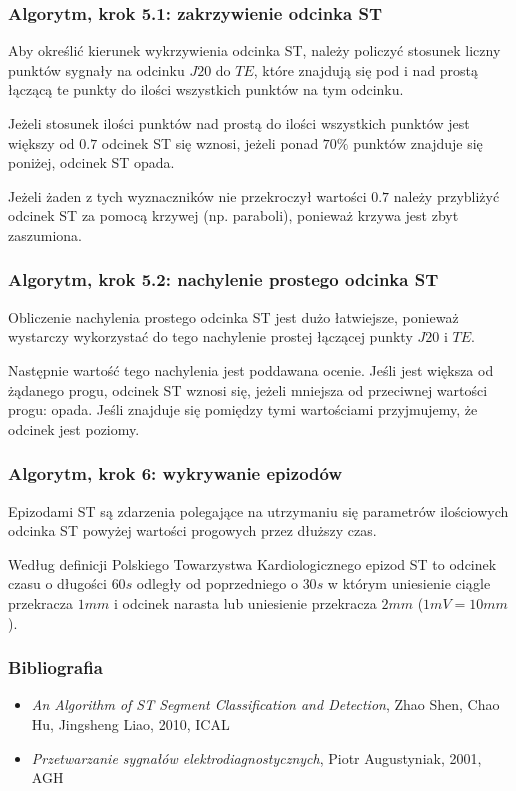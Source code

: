 \documentclass{beamer}
\begin{document}
\begin{frame}
  \frametitle{Algorytm, krok 5.1: zakrzywienie odcinka ST}

  Aby określić kierunek wykrzywienia odcinka ST, należy policzyć stosunek
  liczny punktów sygnały na odcinku $J20$ do $TE$, które znajdują się pod i nad
  prostą łączącą te punkty do ilości wszystkich punktów na tym odcinku.

  Jeżeli stosunek ilości punktów nad prostą do ilości wszystkich punktów jest
  większy od $0.7$ odcinek ST się wznosi, jeżeli ponad $70\%$ punktów znajduje
  się poniżej, odcinek ST opada. 
  
  Jeżeli żaden z tych wyznaczników nie przekroczył wartości $0.7$ należy
  przybliżyć odcinek ST za pomocą krzywej (np. paraboli), ponieważ krzywa jest
  zbyt zaszumiona.

\end{frame}


\begin{frame}
  \frametitle{Algorytm, krok 5.2: nachylenie prostego odcinka ST}
  
  Obliczenie nachylenia prostego odcinka ST jest dużo łatwiejsze, ponieważ
  wystarczy wykorzystać do tego nachylenie prostej łączącej punkty $J20$ i $TE$.

  Następnie wartość tego nachylenia jest poddawana ocenie. Jeśli jest większa od
  żądanego progu, odcinek ST wznosi się, jeżeli mniejsza od przeciwnej wartości
  progu: opada. Jeśli znajduje się pomiędzy tymi wartościami przyjmujemy, że
  odcinek jest poziomy.
\end{frame}

\begin{frame}
  \frametitle{Algorytm, krok 6: wykrywanie epizodów}


  Epizodami ST są zdarzenia polegające na utrzymaniu się parametrów ilościowych
  odcinka ST powyżej wartości progowych przez dłuższy czas.

  Według definicji Polskiego Towarzystwa Kardiologicznego epizod ST to odcinek
  czasu o długości $60s$ odległy od poprzedniego o $30s$ w którym uniesienie
  ciągle przekracza $1mm$ i odcinek narasta lub uniesienie przekracza $2mm$
  ($1mV = 10mm$).
\end{frame}

\begin{frame}
  \frametitle{Bibliografia}

  \begin{itemize}
    \item \emph{An Algorithm of ST Segment Classification and Detection}, Zhao
      Shen, Chao Hu, Jingsheng Liao, 2010, ICAL
    \item \emph{Przetwarzanie sygnałów elektrodiagnostycznych}, Piotr
      Augustyniak, 2001, AGH
  \end{itemize}
\end{frame}
\end{document}

